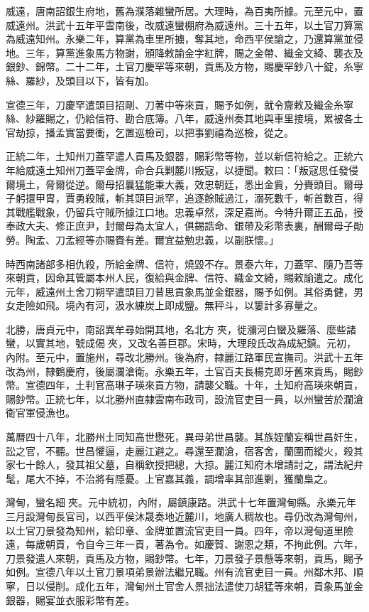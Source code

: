 \begin{pinyinscope}
威遠，唐南詔銀生府地，舊為濮落雜蠻所居。大理時，為百夷所據。元至元中，置威遠州。洪武十五年平雲南後，改威遠蠻棚府為威遠州。三十五年，以土官刀算黨為威遠知州。永樂二年，算黨為車里所擄，奪其地，命西平侯諭之，乃還算黨並侵地。三年，算黨進象馬方物謝，頒降敕諭金字紅牌，賜之金帶、織金文綺、襲衣及銀鈔、錦幣。二十二年，土官刀慶罕等來朝，貢馬及方物，賜慶罕鈔八十錠，糸寧絲、羅紗，及頭目以下，皆有加。

宣德三年，刀慶罕遣頭目招剛、刀著中等來貢，賜予如例，就令齎敕及織金糸寧絲、紗羅賜之，仍給信符、勘合底簿。八年，威遠州奏其地與車里接境，累被各土官劫掠，播孟實當要衝，乞置巡檢司，以把事劉禧為巡檢，從之。

正統二年，土知州刀蓋罕遣人貢馬及銀器，賜彩幣等物，並以新信符給之。正統六年給威遠土知州刀蓋罕金牌，命合兵剿麓川叛寇，以捷聞。敕曰：「叛寇思任發侵爾境土，脅爾從逆。爾母招曩猛能秉大義，效忠朝廷，悉出金貲，分賚頭目。爾母子躬擐甲胄，賈勇殺賊，斬其頭目派罕，追逐餘賊過江，溺死數千，斬首數百，得其戰艦戰象，仍留兵守賊所據江口地。忠義卓然，深足嘉尚。今特升爾正五品，授奉政大夫、修正庶尹，封爾母為太宜人，俱錫誥命、銀帶及彩幣表裏，酬爾母子勛勞。陶孟、刀孟經等亦賜賚有差。爾宜益勉忠義，以副朕懷。」

時西南諸部多相仇殺，所給金牌、信符，燒毀不存。景泰六年，刀蓋罕、隨乃吾等來朝貢，因命其管屬本州人民，復給與金牌、信符、織金文綺，賜敕諭遣之。成化元年，威遠州土舍刀朔罕遣頭目刀昔思貢象馬並金銀器，賜予如例。其俗勇健，男女走險如飛。境內有河，汲水練炭上即成鹽。無秤斗，以簍計多寡量之。

北勝，唐貞元中，南詔異牟尋始開其地，名北方夾，徙瀰河白蠻及羅落、麼些諸蠻，以實其地，號成偈夾，又改名善巨郡。宋時，大理段氏改為成紀鎮。元初，內附。至元中，置施州，尋改北勝州。後為府，隸麗江路軍民宣撫司。洪武十五年改為州，隸鶴慶府，後屬瀾滄衛。永樂五年，土官百夫長楊克即牙舊來貢馬，賜鈔幣。宣德四年，土判官高琳子瑛來貢方物，請襲父職。十年，土知府高瑛來朝貢，賜鈔幣。正統七年，以北勝州直隸雲南布政司，設流官吏目一員，以州蠻苦於瀾滄衛官軍侵漁也。

萬曆四十八年，北勝州土同知高世懋死，異母弟世昌襲。其族姪蘭妄稱世昌奸生，訟之官，不聽。世昌懼逼，走麗江避之。尋還至瀾滄，宿客舍，蘭圍而縱火，殺其家七十餘人，發其祖父墓，自稱欽授把總，大掠。麗江知府木增請討之，謂法紀弁髦，尾大不掉，不治將有隱憂。上官嘉其義，調增率其部進剿，獲蘭梟之。

灣甸，蠻名細夾。元中統初，內附，屬鎮康路。洪武十七年置灣甸縣。永樂元年三月設灣甸長官司，以西平侯沐晟奏地近麓川，地廣人稠故也。尋仍改為灣甸州，以土官刀景發為知州，給印章、金牌並置流官吏目一員。四年，帝以灣甸道里險遠，每歲朝貢，令自今三年一貢，著為令。如慶賀、謝恩之類，不拘此例。六年，刀景發遣人來朝，貢馬及方物，賜鈔幣。七年，刀景發子景懸等來朝，貢馬，賜予如例。宣德八年以土官刀景項弟景辦法繼兄職。州有流官吏目一員。州鄰木邦、順寧，日以侵削。成化五年，灣甸州土官舍人景拙法遣使刀胡猛等來朝，貢象馬並金銀器，賜宴並衣服彩幣有差。


\end{pinyinscope}
